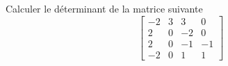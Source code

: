 Calculer le d\'eterminant de la matrice suivante
\[
\left[ 
\begin{array}{cccc}
-2 & 3 & 3 & 0\\
2 & 0 & -2 & 0 \\
2 & 0 & -1 & -1 \\
-2 & 0 & 1 & 1
\end{array}
\right]
\]